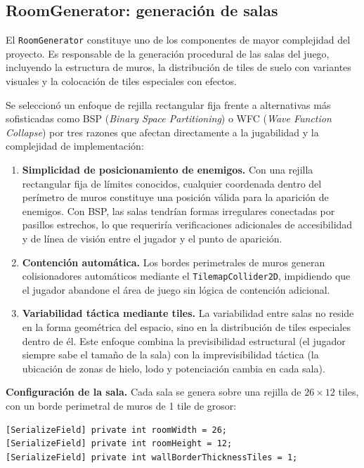\subsection{RoomGenerator: generación de salas}


El \texttt{RoomGenerator} constituye uno de los componentes de mayor complejidad del proyecto. Es responsable de la generación procedural de las salas del juego, incluyendo la estructura de muros, la distribución de tiles de suelo con variantes visuales y la colocación de tiles especiales con efectos.

Se seleccionó un enfoque de rejilla rectangular fija frente a alternativas más sofisticadas como BSP (\textit{Binary Space Partitioning}) o WFC (\textit{Wave Function Collapse}) por tres razones que afectan directamente a la jugabilidad y la complejidad de implementación:

\begin{enumerate}
\item \textbf{Simplicidad de posicionamiento de enemigos.} Con una rejilla rectangular fija de límites conocidos, cualquier coordenada dentro del perímetro de muros constituye una posición válida para la aparición de enemigos. Con BSP, las salas tendrían formas irregulares conectadas por pasillos estrechos, lo que requeriría verificaciones adicionales de accesibilidad y de línea de visión entre el jugador y el punto de aparición.
\item \textbf{Contención automática.} Los bordes perimetrales de muros generan colisionadores automáticos mediante el \texttt{TilemapCollider2D}, impidiendo que el jugador abandone el área de juego sin lógica de contención adicional.
\item \textbf{Variabilidad táctica mediante tiles.} La variabilidad entre salas no reside en la forma geométrica del espacio, sino en la distribución de tiles especiales dentro de él. Este enfoque combina la previsibilidad estructural (el jugador siempre sabe el tamaño de la sala) con la imprevisibilidad táctica (la ubicación de zonas de hielo, lodo y potenciación cambia en cada sala).
\end{enumerate}

\textbf{Configuración de la sala.} Cada sala se genera sobre una rejilla de $26 \times 12$ tiles, con un borde perimetral de muros de 1 tile de grosor:

\begin{lstlisting}
[SerializeField] private int roomWidth = 26;
[SerializeField] private int roomHeight = 12;
[SerializeField] private int wallBorderThicknessTiles = 1;
\end{lstlisting}



